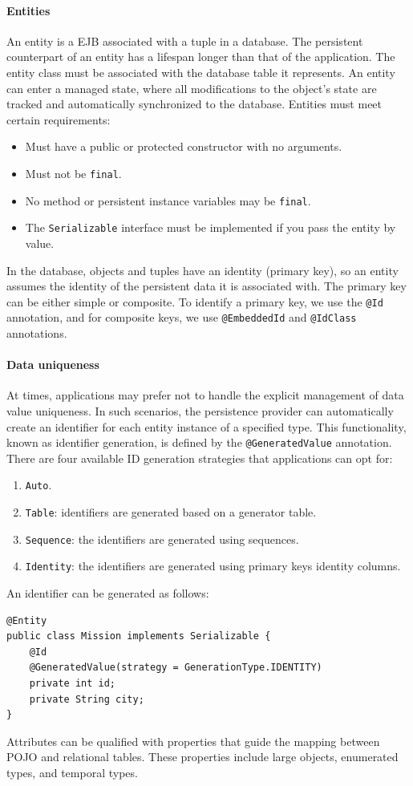 \paragraph*{Entities}
An entity is a EJB associated with a tuple in a database. 
The persistent counterpart of an entity has a lifespan longer than that of the application. 
The entity class must be associated with the database table it represents. 
An entity can enter a managed state, where all modifications to the object's state are tracked and automatically synchronized to the database. 
Entities must meet certain requirements:
\begin{itemize}
    \item Must have a public or protected constructor with no arguments.
    \item Must not be \texttt{final}.
    \item No method or persistent instance variables may be \texttt{final}.
    \item The \texttt{Serializable} interface must be implemented if you pass the entity by value.
\end{itemize}
In the database, objects and tuples have an identity (primary key), so an entity assumes the identity of the persistent data it is associated with.
The primary key can be either simple or composite.
To identify a primary key, we use the \texttt{@Id} annotation, and for composite keys, we use \texttt{@EmbeddedId} and \texttt{@IdClass} annotations.

\paragraph*{Data uniqueness}
At times, applications may prefer not to handle the explicit management of data value uniqueness. 
In such scenarios, the persistence provider can automatically create an identifier for each entity instance of a specified type. 
This functionality, known as identifier generation, is defined by the \texttt{@GeneratedValue} annotation. 
There are four available ID generation strategies that applications can opt for:
\begin{enumerate}
    \item \texttt{Auto}. 
    \item \texttt{Table}: identifiers are generated based on a generator table.
    \item \texttt{Sequence}: the identifiers are generated using sequences. 
    \item \texttt{Identity}: the identifiers are generated using primary keys identity columns. 
\end{enumerate}
\begin{example}
    An identifier can be generated as follows: 
\begin{lstlisting}[style=Java]
@Entity
public class Mission implements Serializable {
    @Id
    @GeneratedValue(strategy = GenerationType.IDENTITY)
    private int id;
    private String city;
}
\end{lstlisting}
\end{example}
Attributes can be qualified with properties that guide the mapping between POJO and relational tables. 
These properties include large objects, enumerated types, and temporal types.

